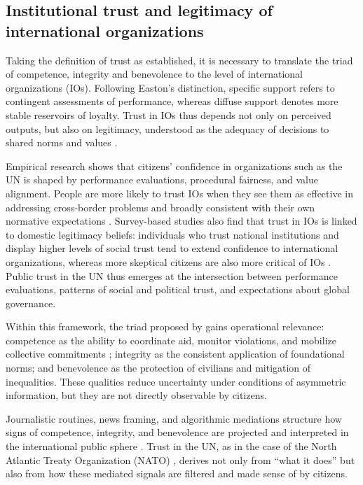 \documentclass[english]{textolivre}
\begin{document}
\subsection{Institutional trust and legitimacy of international organizations}
Taking the definition of trust as established, it is necessary to translate the triad of competence, integrity and benevolence to the level of international organizations (IOs). Following Easton’s \citeyear{easton1975} distinction, specific support refers to contingent assessments of performance, whereas diffuse support denotes more stable reservoirs of loyalty. Trust in IOs thus depends not only on perceived outputs, but also on legitimacy, understood as the adequacy of decisions to shared norms and values \cite{suchman1995managing}.

Empirical research shows that citizens’ confidence in organizations such as the UN is shaped by performance evaluations, procedural fairness, and value alignment. People are more likely to trust IOs when they see them as effective in addressing cross-border problems and broadly consistent with their own normative expectations \cite{tallberg2019, dellmuth2020}. Survey-based studies also find that trust in IOs is linked to domestic legitimacy beliefs: individuals who trust national institutions and display higher levels of social trust tend to extend confidence to international organizations, whereas more skeptical citizens are also more critical of IOs \cite{schlipphak2015}. Public trust in the UN thus emerges at the intersection between performance evaluations, patterns of social and political trust, and expectations about global governance.

Within this framework, the triad proposed by \textcite{mayer1995} gains operational relevance: competence as the ability to coordinate aid, monitor violations, and mobilize collective commitments \cite{keohane2009democracy}; integrity as the consistent application of foundational norms; and benevolence as the protection of civilians and mitigation of inequalities. These qualities reduce uncertainty under conditions of asymmetric information, but they are not directly observable by citizens.

Journalistic routines, news framing, and algorithmic mediations structure how signs of competence, integrity, and benevolence are projected and interpreted in the international public sphere \cite{stromback2014, thomass2025}. Trust in the UN, as in the case of the North Atlantic Treaty Organization (NATO) \cite{sousa2024}, derives not only from ``what it does'' but also from how these mediated signals are filtered and made sense of by citizens.
\end{document}
